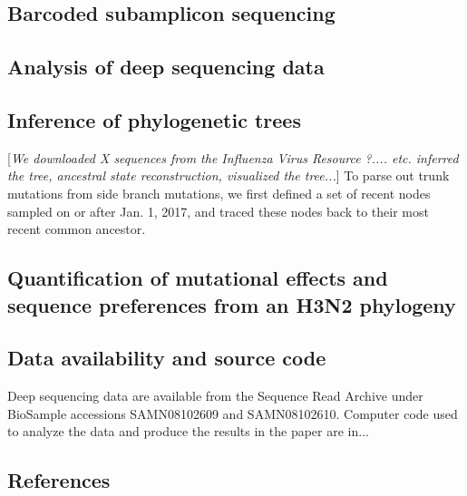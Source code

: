 \documentclass[9pt,twocolumn,twoside]{pnas-new}
\newcommand{\comment}[1]{{\color{red}[\textsl{#1}]}}
\begin{document}
{\subsection*{Barcoded subamplicon sequencing}

\subsection*{Analysis of deep sequencing data}

\subsection*{Inference of phylogenetic trees}
\comment{We downloaded X sequences from the Influenza Virus Resource ?.... etc. inferred the tree, ancestral state reconstruction, visualized the tree...}
To parse out trunk mutations from side branch mutations, we first defined a set of recent nodes sampled on or after Jan. 1, 2017, and traced these nodes back to their most recent common ancestor. 

\subsection*{Quantification of mutational effects and sequence preferences from an H3N2 phylogeny}

\subsection*{Data availability and source code}
Deep sequencing data are available from the Sequence Read Archive under BioSample accessions SAMN08102609 and SAMN08102610. Computer code used to analyze the data and produce the results in the paper are in...
}

\showmatmethods{} %


\showacknow{} %


\subsection*{References}

\end{document}
